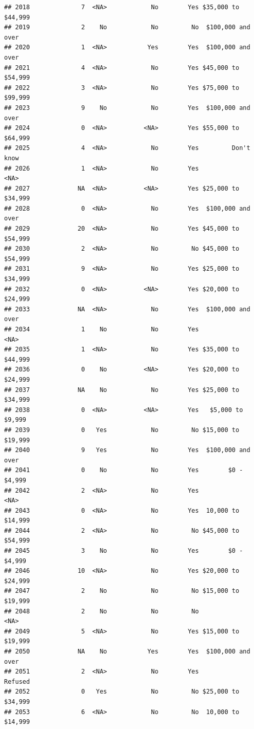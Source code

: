 \documentclass[man]{apa6}
\begin{document}
\begin{verbatim}
## 2018              7  <NA>            No        Yes $35,000 to $44,999
## 2019              2    No            No         No  $100,000 and over
## 2020              1  <NA>           Yes        Yes  $100,000 and over
## 2021              4  <NA>            No        Yes $45,000 to $54,999
## 2022              3  <NA>            No        Yes $75,000 to $99,999
## 2023              9    No            No        Yes  $100,000 and over
## 2024              0  <NA>          <NA>        Yes $55,000 to $64,999
## 2025              4  <NA>            No        Yes         Don't know
## 2026              1  <NA>            No        Yes               <NA>
## 2027             NA  <NA>          <NA>        Yes $25,000 to $34,999
## 2028              0  <NA>            No        Yes  $100,000 and over
## 2029             20  <NA>            No        Yes $45,000 to $54,999
## 2030              2  <NA>            No         No $45,000 to $54,999
## 2031              9  <NA>            No        Yes $25,000 to $34,999
## 2032              0  <NA>          <NA>        Yes $20,000 to $24,999
## 2033             NA  <NA>            No        Yes  $100,000 and over
## 2034              1    No            No        Yes               <NA>
## 2035              1  <NA>            No        Yes $35,000 to $44,999
## 2036              0    No          <NA>        Yes $20,000 to $24,999
## 2037             NA    No            No        Yes $25,000 to $34,999
## 2038              0  <NA>          <NA>        Yes   $5,000 to $9,999
## 2039              0   Yes            No         No $15,000 to $19,999
## 2040              9   Yes            No        Yes  $100,000 and over
## 2041              0    No            No        Yes        $0 - $4,999
## 2042              2  <NA>            No        Yes               <NA>
## 2043              0  <NA>            No        Yes  10,000 to $14,999
## 2044              2  <NA>            No         No $45,000 to $54,999
## 2045              3    No            No        Yes        $0 - $4,999
## 2046             10  <NA>            No        Yes $20,000 to $24,999
## 2047              2    No            No         No $15,000 to $19,999
## 2048              2    No            No         No               <NA>
## 2049              5  <NA>            No        Yes $15,000 to $19,999
## 2050             NA    No           Yes        Yes  $100,000 and over
## 2051              2  <NA>            No        Yes            Refused
## 2052              0   Yes            No         No $25,000 to $34,999
## 2053              6  <NA>            No         No  10,000 to $14,999

\end{verbatim}
\end{document}
